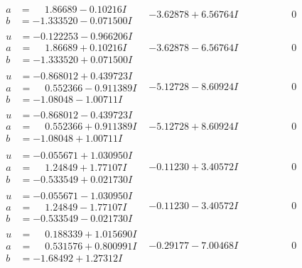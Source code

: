 \documentclass[1p]{elsarticle_modified}
\theoremstyle{definition}
\begin{document}
$$\begin{array}{c|c|c}
\begin{aligned}
a &= \phantom{-}1.86689 - 0.10216 I \\
b &= -1.333520 - 0.071500 I\end{aligned}
 & -3.62878 + 6.56764 I & \phantom{-0.000000 } 0 \\ \hline\begin{aligned}
u &= -0.122253 - 0.966206 I \\
a &= \phantom{-}1.86689 + 0.10216 I \\
b &= -1.333520 + 0.071500 I\end{aligned}
 & -3.62878 - 6.56764 I & \phantom{-0.000000 } 0 \\ \hline\begin{aligned}
u &= -0.868012 + 0.439723 I \\
a &= \phantom{-}0.552366 - 0.911389 I \\
b &= -1.08048 - 1.00711 I\end{aligned}
 & -5.12728 - 8.60924 I & \phantom{-0.000000 } 0 \\ \hline\begin{aligned}
u &= -0.868012 - 0.439723 I \\
a &= \phantom{-}0.552366 + 0.911389 I \\
b &= -1.08048 + 1.00711 I\end{aligned}
 & -5.12728 + 8.60924 I & \phantom{-0.000000 } 0 \\ \hline\begin{aligned}
u &= -0.055671 + 1.030950 I \\
a &= \phantom{-}1.24849 + 1.77107 I \\
b &= -0.533549 + 0.021730 I\end{aligned}
 & -0.11230 + 3.40572 I & \phantom{-0.000000 } 0 \\ \hline\begin{aligned}
u &= -0.055671 - 1.030950 I \\
a &= \phantom{-}1.24849 - 1.77107 I \\
b &= -0.533549 - 0.021730 I\end{aligned}
 & -0.11230 - 3.40572 I & \phantom{-0.000000 } 0 \\ \hline\begin{aligned}
u &= \phantom{-}0.188339 + 1.015690 I \\
a &= \phantom{-}0.531576 + 0.800991 I \\
b &= -1.68492 + 1.27312 I\end{aligned}
 & -0.29177 - 7.00468 I & \phantom{-0.000000 } 0 \\ \hline\begin{aligned}

\end{aligned}
\end{array}$$
\end{document}
